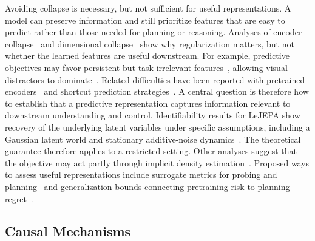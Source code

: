 \documentclass[acmsmall,screen,review,anonymous]{acmart}
\begin{document}
Avoiding collapse is necessary, but not sufficient for useful representations.
%
A model can preserve information and still prioritize features that are easy to predict rather than those needed for planning or reasoning.
%
Analyses of encoder collapse~\citep{mo2024cjepa} and dimensional collapse~\citep{jing2022understanding} show why regularization matters, but not whether the learned features are useful downstream.
%
For example, predictive objectives may favor persistent but task-irrelevant features~\citep{littwin2024}, allowing visual distractors to dominate~\citep{sobal2022jointembeddingpredictivearchitectures}.
%
Related difficulties have been reported with pretrained encoders~\citep{toso2026learninginvariantvisualrepresentations} and shortcut prediction strategies~\citep{nam2026causaljepa}.
%
A central question is therefore how to establish that a predictive representation captures information relevant to downstream understanding and control.
%
Identifiability results for LeJEPA show recovery of the underlying latent variables under specific assumptions, including a Gaussian latent world and stationary additive-noise dynamics~\citep{klindt2026lejepa}.
%
The theoretical guarantee therefore applies to a restricted setting.
%
Other analyses suggest that the objective may act partly through implicit density estimation~\citep{balestriero2025gaussianembeddingsjepassecretly}.
%
Proposed ways to assess useful representations include surrogate metrics for probing and planning~\citep{thilak2024lidar, balestriero2025lejepaprovablescalableselfsupervised} and generalization bounds connecting pretraining risk to planning regret~\citep{cui2026generalizationtheoryjepabasedworld}.


\subsection{Causal Mechanisms}
\end{document}
